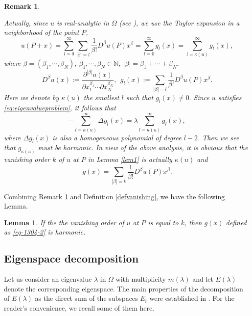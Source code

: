 \documentclass[11pt,reqno]{article}
\newtheorem{lemma}[teo]{Lemma}
\newtheorem{rem}[teo]{Remark}
\numberwithin{equation}{section}
\newcommand\N{\mathbb N}
\newcommand\la\lambda
\renewcommand\O\Omega
\begin{document}
    \begin{rem}\label{rmi1}
    
        Actually, since $u$ is real-analytic in $\O$ (see \cite[Theorem 7.5.1]{hormander1963linear}), we use the Taylor expansion in a neighborhood of the point $P$, 
\begin{equation*}
    u(P+x)=\sum_{l=0}^\infty\sum_{|\beta|=l}\frac{1}{\beta!}D^\beta u(P)x^\beta=\sum_{l=0}^\infty g_l(x)=\sum_{l=\kappa(u)}^\infty g_l(x), 
\end{equation*}
where $\beta=(\beta_1,\cdots,\beta_N)$, $\beta_1,\cdots,\beta_N\in\N$, $|\beta|=\beta_1+\cdots+\beta_N$,
$$
 D^\beta u(x):=\frac{\partial^{|\beta|}u(x)}{\partial x_1^{\beta_1}\cdots\partial x_N^{\beta_N}},\ \ 
g_l(x):=\sum_{|\beta|=l}\frac{1}{\beta!}D^\beta u(P)x^\beta.
$$
Here we denote by $\kappa(u)$ the smallest $l$ such that 
$g_l(x)\neq 0.$
Since $u$ satisfies \eqref{eq:eigenvalueproblem}, it follows that 
\begin{equation*}
    -\sum_{l=\kappa(u)}^\infty\Delta g_l(x)= \lambda\sum_{l=\kappa(u)}^\infty  g_l(x) ,
\end{equation*}
where $\Delta g_l(x)$ is also a homogeneous polynomial of degree $l-2$. Then we see that $g_{\kappa(u)}$ must be harmonic. In view of the above analysis, it is obvious that the \emph{vanishing order} $k$ of $u$ at $P$ in Lemma \ref{lem1} is actually $\kappa(u)$ and 
\begin{equation}\label{eq-1304-2}
    g(x)=\sum_{|\beta|=k}\frac{1}{\beta!}D^\beta u(P)x^\beta.
\end{equation}
    \end{rem}
Combining Remark \ref{rmi1} and Definition \ref{defvanishing}, we have the following Lemma.
\begin{lemma}\label{lem2212-1}
    If the the vanishing order of $u$  at $P$ is equal to $k$, then $g(x)$ defined as \eqref{eq-1304-2} is harmonic.
\end{lemma}

\subsection{Eigenspace decomposition}\label{ss2}
	Let us consider an eigenvalue $\la$ in $\O$ with multiplicity $m(\la)$
     and let $E(\la)$ denote the corresponding eigenspace.  The main properties of the decomposition of $E(\lambda)$ as the direct sum of the subspaces $E_i$ were established in \cite{alm1,alm2}. For the reader's convenience, we recall some of them here. 
\end{document}
